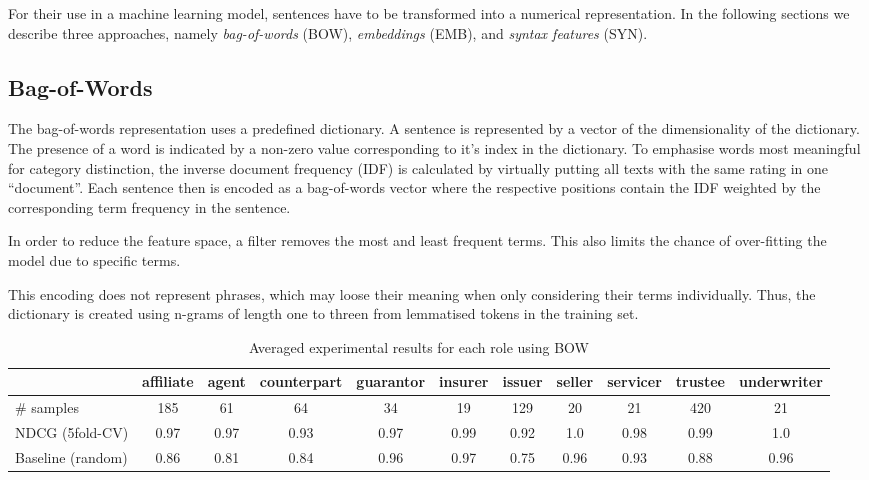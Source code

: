 For their use in a machine learning model, sentences have to be transformed into a numerical representation.
In the following sections we describe three approaches, namely \textit{bag-of-words} (BOW), \textit{embeddings} (EMB), and \textit{syntax features} (SYN).


\subsection{Bag-of-Words}
The bag-of-words representation uses a predefined dictionary.
A sentence is represented by a vector of the dimensionality of the dictionary.
The presence of a word is indicated by a non-zero value corresponding to it's index in the dictionary.
To emphasise words most meaningful for category distinction, the inverse document frequency (IDF) is calculated by virtually putting all texts with the same rating in one ``document''. 
Each sentence then is encoded as a bag-of-words vector where the respective positions contain the IDF weighted by the corresponding term frequency in the sentence.

In order to reduce the feature space, a filter removes the most and least frequent terms.
This also limits the chance of over-fitting the model due to specific terms.

This encoding does not represent phrases, which may loose their meaning when only considering their terms individually.
Thus, the dictionary is created using n-grams of length one to threen from lemmatised tokens in the training set.
\begin{table*}
	\caption{Averaged experimental results for each role using BOW}
	\label{tab:roleresults}
	\begin{tabular}{lcccccccccc}
		\toprule
		& affiliate & agent & counterpart & guarantor & insurer & issuer & seller & servicer & trustee & underwriter \\
		\midrule
		\# samples        & 185  & 61   & 64   & 34   & 19   & 129  & 20   & 21   & 420  & 21   \\
		NDCG (5fold-CV)   & 0.97 & 0.97 & 0.93 & 0.97 & 0.99 & 0.92 & 1.0  & 0.98 & 0.99 & 1.0  \\
		Baseline (random) & 0.86 & 0.81 & 0.84 & 0.96 & 0.97 & 0.75 & 0.96 & 0.93 & 0.88 & 0.96 \\
		\bottomrule
	\end{tabular}
\end{table*}


